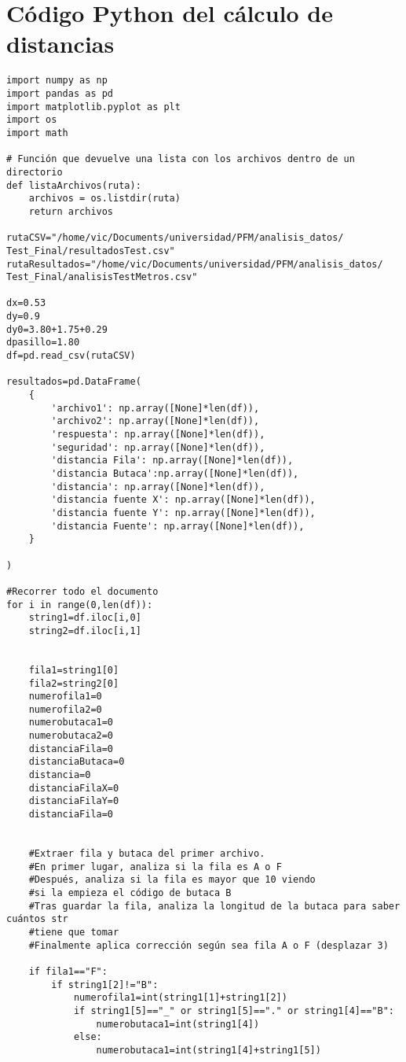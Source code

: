 \documentclass[11pt,a4paper,twoside]{book}
\begin{document}
\section{Código Python del cálculo de distancias}

\begin{verbatim}
import numpy as np
import pandas as pd
import matplotlib.pyplot as plt
import os
import math

# Función que devuelve una lista con los archivos dentro de un directorio
def listaArchivos(ruta):
    archivos = os.listdir(ruta)
    return archivos

rutaCSV="/home/vic/Documents/universidad/PFM/analisis_datos/
Test_Final/resultadosTest.csv"
rutaResultados="/home/vic/Documents/universidad/PFM/analisis_datos/
Test_Final/analisisTestMetros.csv"

dx=0.53
dy=0.9
dy0=3.80+1.75+0.29
dpasillo=1.80
df=pd.read_csv(rutaCSV)

resultados=pd.DataFrame(
    {
        'archivo1': np.array([None]*len(df)),
        'archivo2': np.array([None]*len(df)),
        'respuesta': np.array([None]*len(df)),
        'seguridad': np.array([None]*len(df)),
        'distancia Fila': np.array([None]*len(df)),
        'distancia Butaca':np.array([None]*len(df)),
        'distancia': np.array([None]*len(df)),
        'distancia fuente X': np.array([None]*len(df)),
        'distancia fuente Y': np.array([None]*len(df)),
        'distancia Fuente': np.array([None]*len(df)),
    }

)

#Recorrer todo el documento
for i in range(0,len(df)):
    string1=df.iloc[i,0]
    string2=df.iloc[i,1]


    fila1=string1[0]
    fila2=string2[0]
    numerofila1=0
    numerofila2=0
    numerobutaca1=0
    numerobutaca2=0
    distanciaFila=0
    distanciaButaca=0
    distancia=0
    distanciaFilaX=0
    distanciaFilaY=0
    distanciaFila=0


    #Extraer fila y butaca del primer archivo. 
    #En primer lugar, analiza si la fila es A o F
    #Después, analiza si la fila es mayor que 10 viendo 
    #si la empieza el código de butaca B
    #Tras guardar la fila, analiza la longitud de la butaca para saber cuántos str 
    #tiene que tomar
    #Finalmente aplica corrección según sea fila A o F (desplazar 3)

    if fila1=="F":
        if string1[2]!="B":
            numerofila1=int(string1[1]+string1[2])
            if string1[5]=="_" or string1[5]=="." or string1[4]=="B":
                numerobutaca1=int(string1[4])
            else:
                numerobutaca1=int(string1[4]+string1[5])



\end{verbatim}
\end{document}
